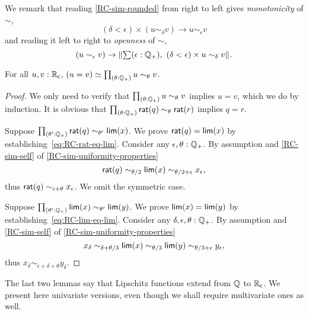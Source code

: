 \noindent
We remark that reading \autoref{RC-sim-rounded} from right to left gives
\emph{monotonicity} of $\sim$,
%
\begin{equation*}
  (\delta < \epsilon) \times (u \sim_\delta v) \to u \sim_\epsilon v
\end{equation*}
%
and reading it left to right to \emph{openness} of $\sim$,
%
\begin{equation*}
  (u \sim_\epsilon v) \to \brck{\sm{\epsilon : \Qp} (\delta < \epsilon) \times u \sim_\delta v}.
\end{equation*}

\begin{lem} \label{RC-weak-archimedean}
  For all $u, v : \mathbb{R}_\mathsf{c}$, $\eqv{(u = v)}{\prd{\theta : \Qp} u \sim_\theta v}$.
\end{lem}

\begin{proof}
  We only need to verify that $\prd{\theta : \Qp} u \sim_\theta v$ implies $u = v$,
  which we do by induction. It is obvious that $\prd{\theta : \Qp} \rcrat(q)
  \sim_\theta \rcrat(r)$ implies $q = r$.

  Suppose $\prd{\theta' : \Qp} \rcrat(q) \sim_{\theta'} \rclim(x)$. We prove $\mathsf{rat}(q) =
  \mathsf{lim}(x)$ by establishing~\eqref{eq:RC-rat-eq-lim}. Consider any $\epsilon, \theta :
  \mathbb{Q}_{+}$. By assumption and \autoref{RC-sim-self} of \autoref{RC-sim-uniformity-properties}
  \begin{equation*}
    \mathsf{rat}(q) \sim_{\theta/2} \mathsf{lim}(x) \sim_{\theta/2 + \epsilon} x_\epsilon,
  \end{equation*}
  thus $\mathsf{rat}(q) \sim_{\epsilon + \theta} x_\epsilon$. We omit the symmetric case.

  Suppose $\prd{\theta' : \Qp} \rclim(x) \sim_{\theta'} \rclim(y)$. We prove $\mathsf{lim}(x) =
  \mathsf{lim}(y)$ by establishing~\eqref{eq:RC-lim-eq-lim}. Consider any $\delta, \epsilon,
  \theta : \mathbb{Q}_{+}$. By assumption and \autoref{RC-sim-self} of
  \autoref{RC-sim-uniformity-properties}
  \begin{equation*}
    x_\delta \sim_{\delta + \theta/3}
    \mathsf{lim}(x) \sim_{\theta/3}
    \mathsf{lim}(y) \sim_{\theta/3 + \epsilon}
    y_\epsilon,
  \end{equation*}
  thus $x_\delta \sim_{\epsilon + \delta + \theta} y_\delta$.
\end{proof}

The last two lemmas say that Lipschitz functions extend from $\mathbb{Q}$ to $\mathbb{R}_\mathsf{c}$. We present
here univariate versions, even though we shall require multivariate ones as well.

